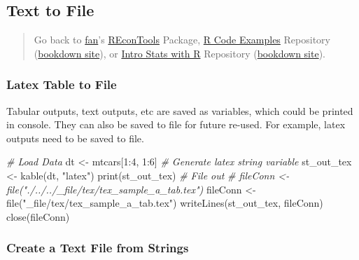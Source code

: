 \documentclass[
]{book}
\newenvironment{Shaded}{\begin{snugshade}}{\end{snugshade}}
\newcommand{\CommentTok}[1]{\textcolor[rgb]{0.56,0.35,0.01}{\textit{#1}}}
\newcommand{\DecValTok}[1]{\textcolor[rgb]{0.00,0.00,0.81}{#1}}
\newcommand{\FunctionTok}[1]{\textcolor[rgb]{0.00,0.00,0.00}{#1}}
\newcommand{\NormalTok}[1]{#1}
\newcommand{\OtherTok}[1]{\textcolor[rgb]{0.56,0.35,0.01}{#1}}
\newcommand{\SpecialCharTok}[1]{\textcolor[rgb]{0.00,0.00,0.00}{#1}}
\newcommand{\StringTok}[1]{\textcolor[rgb]{0.31,0.60,0.02}{#1}}
\begin{document}
\hypertarget{text-to-file}{%
\subsection{Text to File}\label{text-to-file}}

\begin{quote}
Go back to \href{http://fanwangecon.github.io/}{fan}'s \href{https://fanwangecon.github.io/REconTools/}{REconTools} Package, \href{https://fanwangecon.github.io/R4Econ/}{R Code Examples} Repository (\href{https://fanwangecon.github.io/R4Econ/bookdown}{bookdown site}), or \href{https://fanwangecon.github.io/Stat4Econ/}{Intro Stats with R} Repository (\href{https://fanwangecon.github.io/Stat4Econ/bookdown}{bookdown site}).
\end{quote}

\hypertarget{latex-table-to-file}{%
\subsubsection{Latex Table to File}\label{latex-table-to-file}}

Tabular outputs, text outputs, etc are saved as variables, which could be printed in console. They can also be saved to file for future re-used. For example, latex outputs need to be saved to file.

\begin{Shaded}
\begin{Highlighting}[]
\CommentTok{\# Load Data}
\NormalTok{dt }\OtherTok{\textless{}{-}}\NormalTok{ mtcars[}\DecValTok{1}\SpecialCharTok{:}\DecValTok{4}\NormalTok{, }\DecValTok{1}\SpecialCharTok{:}\DecValTok{6}\NormalTok{]}
\CommentTok{\# Generate latex string variable}
\NormalTok{st\_out\_tex }\OtherTok{\textless{}{-}} \FunctionTok{kable}\NormalTok{(dt, }\StringTok{"latex"}\NormalTok{)}
\FunctionTok{print}\NormalTok{(st\_out\_tex)}
\CommentTok{\# File out}
\CommentTok{\# fileConn \textless{}{-} file("./../../\_file/tex/tex\_sample\_a\_tab.tex")}
\NormalTok{fileConn }\OtherTok{\textless{}{-}} \FunctionTok{file}\NormalTok{(}\StringTok{"\_file/tex/tex\_sample\_a\_tab.tex"}\NormalTok{)}
\FunctionTok{writeLines}\NormalTok{(st\_out\_tex, fileConn)}
\FunctionTok{close}\NormalTok{(fileConn)}
\end{Highlighting}
\end{Shaded}

\hypertarget{create-a-text-file-from-strings}{%
\subsubsection{Create a Text File from Strings}\label{create-a-text-file-from-strings}}
\end{document}
